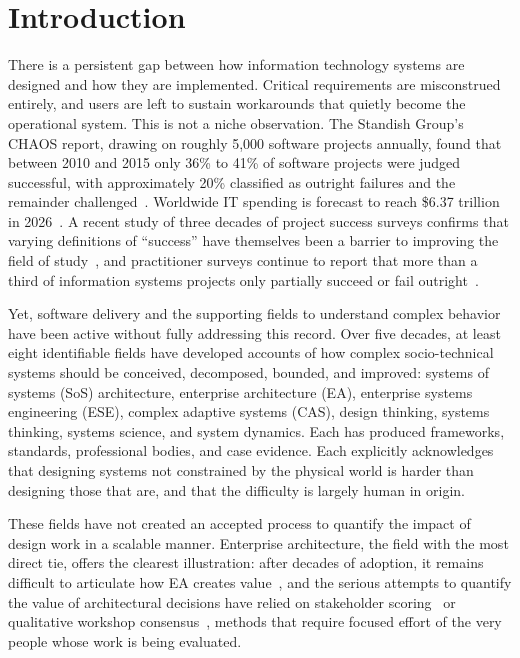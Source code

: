 \documentclass{csimq}
\begin{document}
\section{Introduction}

There is a persistent gap between how information technology systems are
designed and how they are implemented. Critical requirements are misconstrued entirely, and users are
left to sustain workarounds that quietly become the operational system. This is
not a niche observation. The Standish Group's CHAOS report, drawing on roughly
5{,}000 software projects annually, found that between 2010 and 2015 only 36\%
to 41\% of software projects were judged successful, with approximately 20\%
classified as outright failures and the remainder challenged~\cite{standish2015}.
Worldwide IT spending is forecast to reach \$6.37 trillion in
2026~\cite{gartner2026}. A recent study of three decades of project success
surveys confirms that varying definitions of ``success'' have themselves
been a barrier to improving the field of study~\cite{loureiro2024}, and practitioner
surveys continue to report that more than a third of information systems
projects only partially succeed or fail outright~\cite{pereira2021}.

Yet, software delivery and the supporting fields to understand complex behavior have been active without fully addressing this record. Over five
decades, at least eight identifiable fields have developed accounts of how
complex socio-technical systems should be conceived, decomposed, bounded, and
improved: systems of systems (SoS) architecture, enterprise architecture (EA),
enterprise systems engineering (ESE), complex adaptive systems (CAS), design
thinking, systems thinking, systems science, and system dynamics. Each has
produced frameworks, standards, professional bodies, and case evidence. Each
explicitly acknowledges that designing systems not constrained by the physical
world is harder than designing those that are, and that the difficulty is
largely human in origin.

These fields have not created an accepted process to quantify the impact of design work in a scalable manner. Enterprise architecture, the field with the most direct tie, offers the clearest illustration:
after decades of adoption, it remains difficult to articulate how EA creates
value~\cite{gong2019,saintlouis2017}, and the serious attempts to quantify the
value of architectural decisions have relied on stakeholder
scoring~\cite{moore2003} or qualitative workshop
consensus~\cite{nord2014}, methods that require focused effort of the very people whose work is being evaluated.
\end{document}
